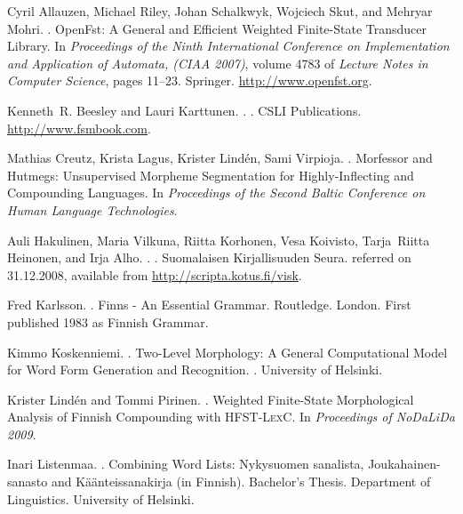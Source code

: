 \documentclass[a4paper]{article}
\begin{document}
\begin{thebibliography}{14}

Cyril Allauzen, Michael Riley, Johan Schalkwyk, Wojciech Skut, and Mehryar
  Mohri.
.
\newblock Open{F}st: A General and Efficient Weighted Finite-State Transducer
  Library.
\newblock In {\em Proceedings of the Ninth International Conference on
  Implementation and Application of Automata, (CIAA 2007)}, volume 4783 of {\em
  Lecture Notes in Computer Science}, pages 11--23. Springer.
\newblock \url{http://www.openfst.org}.

Kenneth~R. Beesley and Lauri Karttunen.
.
.
\newblock CSLI Publications.
\newblock \url{http://www.fsmbook.com}.

\newblock Mathias Creutz, Krista Lagus, Krister Lindén, Sami Virpioja.
.
\newblock Morfessor and Hutmegs: Unsupervised Morpheme Segmentation for Highly-Inflecting and Compounding Languages.
\newblock In {\em Proceedings of the Second Baltic Conference on Human Language Technologies}.

Auli Hakulinen, Maria Vilkuna, Riitta Korhonen, Vesa Koivisto, Tarja~Riitta
  Heinonen, and Irja Alho.
.
.
\newblock Suomalaisen Kirjallisuuden Seura.
\newblock referred on 31.12.2008, available from
  \url{http://scripta.kotus.fi/visk}.

Fred Karlsson.
.
\newblock Finns - An Essential Grammar.
\newblock Routledge. London. First published 1983 as Finnish Grammar.


Kimmo Koskenniemi.
.
\newblock Two-Level Morphology: A General Computational Model for Word Form Generation and Recognition.
. University of Helsinki.

Krister Lindén and Tommi Pirinen.
.
\newblock Weighted Finite-State Morphological Analysis of Finnish Compounding
with \textsc{HFST-LexC}.
\newblock In {\em Proceedings of NoDaLiDa 2009}.

Inari Listenmaa.
.
\newblock Combining Word Lists: Nykysuomen sanalista, Joukahainen-sanasto 
and Käänteissanakirja (in Finnish). 
\newblock Bachelor’s Thesis. Department of Linguistics. University of Helsinki. 


\end{thebibliography}
\end{document}
